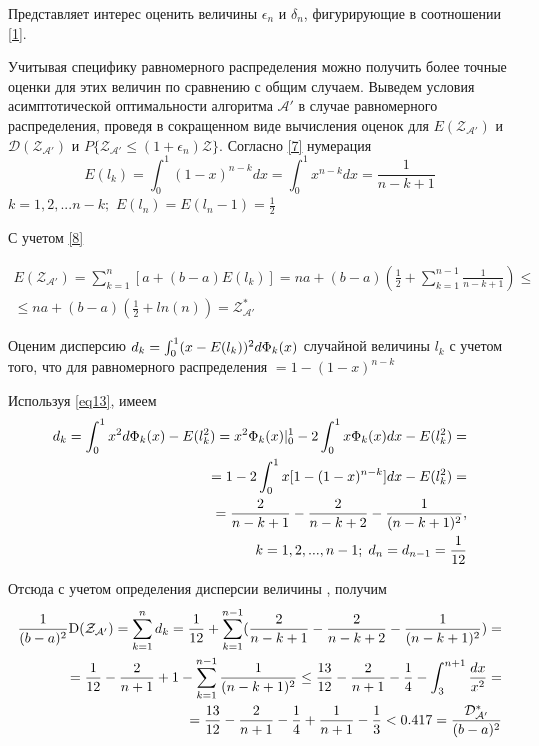 \documentclass[a4paper, 14pt]{extarticle}
\begin{document}
Представляет интерес оценить величины $\epsilon_n$ и $\delta_n$, фигурирующие в соотношении \ref{1}.

Учитывая специфику равномерного распределения можно получить более точные оценки для этих величин по сравнению с общим случаем. Выведем условия асимптотической оптимальности алгоритма $\mathcal{A'}$ в случае равномерного распределения, проведя в сокращенном виде вычисления оценок для $E(\mathcal{Z_{A'}})$ и $\mathcal{D(Z_{A'})}$ и $P \{ \mathcal{Z_{A'}} \leq (1+\epsilon_n)\mathcal{Z} \}$. Согласно \ref{7} нумерация
\begin{equation}\label{eq13} 
E(l_k) = \int_0^1 (1-x)^{n-k}dx = \int_0^1 x^{n-k}dx = \frac{1}{n-k+1}
\end{equation}
$k=1,2,...n-k;$  $ E(l_n) = E(l_n-1) = \frac{1}{2}$

С учетом \ref{8}

\begin{equation}
\begin{aligned}
E(\mathcal{Z_{A'}}) = \sum_{k=1}^{n} [a+(b-a)E(l_k)] = na +(b-a)(\frac{1}{2}+\sum_{k=1}^{n-1} \frac{1}{n-k+1}) \leq \\
\leq na+(b-a)(\frac{1}{2} + ln(n)) = \mathcal{Z^*_{A'}}
\end{aligned}
\end{equation}

Оценим дисперсию $d_k=\int_0^1 (x-E(l_k))^2 d\text{$\Phi_k(x)$}$ случайной величины $l_k$ с учетом того, что для равномерного распределения \chanceLklesserX $ = 1-(1-x)^{n-k}$

Используя \ref{eq13}, имеем
\begin{equation}
\begin{aligned}
d_k = \int_0^1 x^2 d \text{$\Phi_k(x)$}-E(l_k^2)=x^2 \text{$\Phi_k(x)$} 	
|_0^1 - 2 \int_0^1 x \text{$\Phi_k(x)$}dx - E(l_k^2)=\\
= 1-2\int_0^1 x[1-(1-x)^{n-k}]dx-E(l_k^2) =\\
= \frac{2}{n-k+1} - \frac{2}{n-k+2} - \frac{1}{(n-k+1)^2}, \\ 
\; k=1,2,...,n-1; \; d_n = d_{n-1} = \frac{1}{12}
\end{aligned}
\end{equation}

Отсюда с учетом определения дисперсии величины \randomvalue , получим
\begin{equation}
\begin{aligned}
\frac{1}{(b-a)^2} \text{D($\mathcal{Z_{A'}}$)} = \sum_{k=1}^n d_k = \frac{1}{12} + \sum_{k=1}^{n-1} (\frac{2}{n-k+1} - \frac{2}{n-k+2} - \frac{1}{(n-k+1)^2}) = \\
= \frac{1}{12} - \frac{2}{n+1} +1 - \sum_{k=1}^{n-1} \frac{1}{(n-k+1)^2} \leq \frac{13}{12} - \frac{2}{n+1} - \frac{1}{4} - \int_3^{n+1} \frac{dx}{x^2} = \\
= \frac{13}{12} - \frac{2}{n+1} - \frac{1}{4} + \frac{1}{n+1} - \frac{1}{3} < 0.417 = \frac{\text{$\mathcal{D^*_{A'}}$}}{(b-a)^2} 
\end{aligned}
\end{equation}
\end{document}
